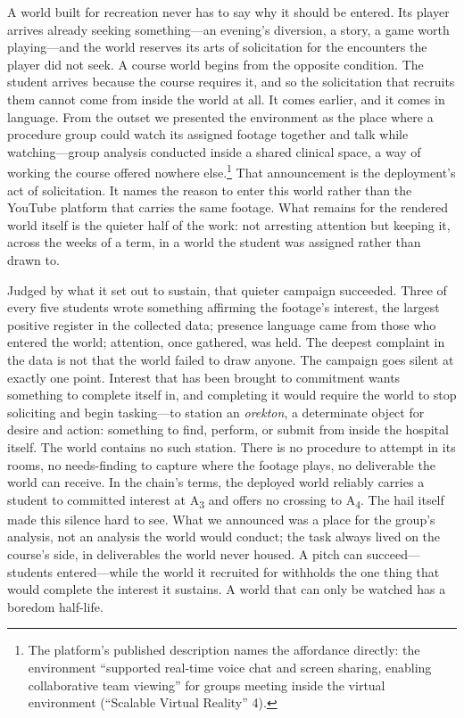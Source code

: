 A world built for recreation never has to say why it should be entered.
Its player arrives already seeking something---an evening's diversion, a
story, a game worth playing---and the world reserves its arts of
solicitation for the encounters the player did not seek. A course world
begins from the opposite condition. The student arrives because the
course requires it, and so the solicitation that recruits them cannot
come from inside the world at all. It comes earlier, and it comes in
language. From the outset we presented the environment as the place
where a procedure group could watch its assigned footage together and
talk while watching---group analysis conducted inside a shared clinical
space, a way of working the course offered nowhere else.\footnote{The
platform's published description names the affordance directly: the
environment ``supported real-time voice chat and screen sharing,
enabling collaborative team viewing'' for groups meeting inside the
virtual environment (``Scalable Virtual Reality'' 4).} That
announcement is the deployment's act of solicitation. It names the
reason to enter this world rather than the YouTube platform that
carries the same footage. What remains for the rendered world itself is
the quieter half of the work: not arresting attention but keeping it,
across the weeks of a term, in a world the student was assigned rather
than drawn to.

Judged by what it set out to sustain, that quieter campaign succeeded.
Three of every five students wrote something affirming the footage's
interest, the largest positive register in the collected data;
presence language came from those who entered the world; attention,
once gathered, was held. The deepest complaint in the data is not that
the world failed to draw anyone. The campaign goes silent at exactly one
point. Interest that has been brought to commitment wants something to
complete itself in, and completing it would require the world to stop
soliciting and begin tasking---to station an \textit{orekton}, a
determinate object for desire and action: something to find, perform,
or submit from inside the hospital itself. The world contains no such
station. There is no procedure to attempt in its rooms, no
needs-finding to capture where the footage plays, no deliverable the
world can receive. In the chain's terms, the deployed world reliably
carries a student to committed interest at A\textsubscript{3} and
offers no crossing to A\textsubscript{4}. The hail itself made this
silence hard to see. What we announced was a place for the group's
analysis, not an analysis the world would conduct; the task always
lived on the course's side, in deliverables the world never housed. A
pitch can succeed---students entered---while the world it recruited for
withholds the one thing that would complete the interest it sustains. A
world that can only be watched has a boredom half-life.

